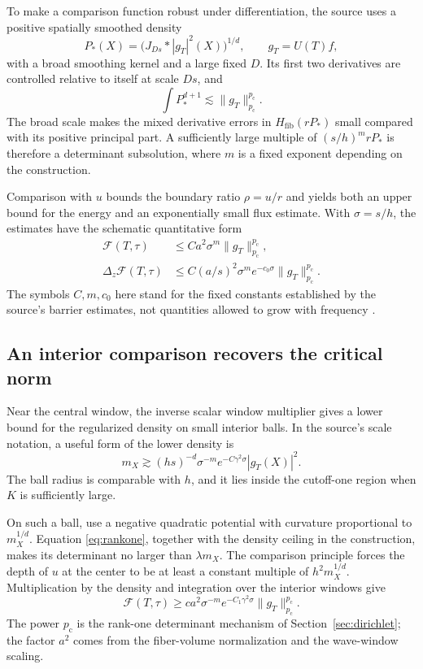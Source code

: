\documentclass[11pt,a4paper]{article}
\numberwithin{equation}{section}
\theoremstyle{definition}
\theoremstyle{remark}
\newcommand{\pc}{p_{\mathrm c}}
\begin{document}
To make a comparison function robust under differentiation, the source uses a
positive spatially smoothed density
\[
 P_*(X)=\bigl(J_{Ds}*|g_T|^2(X)\bigr)^{1/d},
 \qquad g_T=U(T)f,
\]
with a broad smoothing kernel and a large fixed $D$. Its first two derivatives
are controlled relative to itself at scale $Ds$, and
\begin{equation}\label{eq:psmooth}
 \int P_*^{d+1}\lesssim\|g_T\|_{\pc}^{\pc}.
\end{equation}
The broad scale makes the mixed derivative errors in $H_{\mathrm{fib}}(rP_*)$
small compared with its positive principal part. A sufficiently large
multiple of $(s/h)^m rP_*$ is therefore a determinant subsolution, where $m$
is a fixed exponent depending on the construction.

Comparison with $u$ bounds the boundary ratio $\rho=u/r$ and yields both an
upper bound for the energy and an exponentially small flux estimate. With
$\sigma=s/h$, the estimates have the schematic quantitative form
\begin{align}
 \mathcal F(T,\tau)&\le C a^2\sigma^m\|g_T\|_{\pc}^{\pc},
                                                    \label{eq:upperF}\\
 \Delta_z\mathcal F(T,\tau)&\le
 C(a/s)^2\sigma^m e^{-c_0\sigma}\|g_T\|_{\pc}^{\pc}.
                                                    \label{eq:fluxF}
\end{align}
The symbols $C,m,c_0$ here stand for the fixed constants established by the
source's barrier estimates, not quantities allowed to grow with frequency
\cite{barrier}.

\subsection{An interior comparison recovers the critical norm}
Near the central window, the inverse scalar window multiplier gives a lower
bound for the regularized density on small interior balls. In the source's
scale notation, a useful form of the lower density is
\[
 m_X\gtrsim (hs)^{-d}\sigma^{-m}e^{-C\gamma^2\sigma}|g_T(X)|^2.
\]
The ball radius is comparable with $h$, and it lies inside the cutoff-one
region when $K$ is sufficiently large.

On such a ball, use a negative quadratic potential with curvature proportional
to $m_X^{1/d}$. Equation \eqref{eq:rankone}, together with the density ceiling
in the construction, makes its determinant no larger than $\lambda m_X$.
The comparison principle forces the depth of $u$ at the center to be at least
a constant multiple of $h^2m_X^{1/d}$. Multiplication by the density and
integration over the interior windows give
\begin{equation}\label{eq:lowerF}
 \mathcal F(T,\tau)\ge
 c a^2\sigma^{-m}e^{-C_1\gamma^2\sigma}\|g_T\|_{\pc}^{\pc}.
\end{equation}
The power $\pc$ is the rank-one determinant mechanism of
Section~\ref{sec:dirichlet}; the factor $a^2$ comes from the fiber-volume
normalization and the wave-window scaling.
\end{document}
